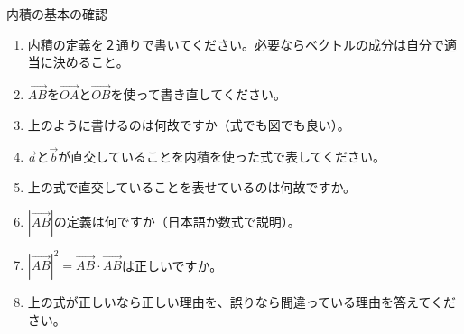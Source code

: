\documentclass[12pt,a4paper]{jsarticle}
\begin{document}
内積の基本の確認
\begin{enumerate}
    \item 内積の定義を２通りで書いてください。必要ならベクトルの成分は自分で適当に決めること。
    \item $\overrightarrow{AB}$を$\overrightarrow{OA}$と$\overrightarrow{OB}$を使って書き直してください。
    \item 上のように書けるのは何故ですか（式でも図でも良い）。
    \item $\overrightarrow{a}$と$\overrightarrow{b}$が直交していることを内積を使った式で表してください。
    \item 上の式で直交していることを表せているのは何故ですか。
    \item $\left| \overrightarrow{AB} \right|$の定義は何ですか（日本語か数式で説明）。
    \item $\left| \overrightarrow{AB} \right|^2=\overrightarrow{AB}\cdot \overrightarrow{AB}$は正しいですか。
    \item 上の式が正しいなら正しい理由を、誤りなら間違っている理由を答えてください。
\end{enumerate}
\end{document}
